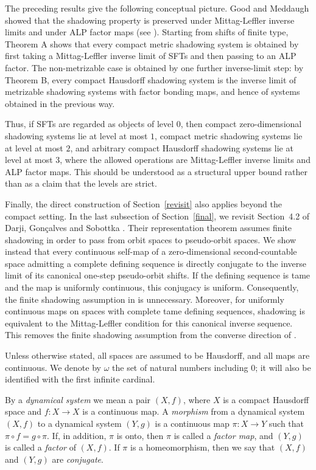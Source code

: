 \documentclass[10pt,a4paper]{amsart}
\numberwithin{equation}{section}
\begin{document}
The preceding results give the following conceptual picture. Good and
Meddaugh showed that the shadowing property is preserved under
Mittag-Leffler inverse limits and under ALP factor
maps (see \cite[Section 5]{GM}). Starting from shifts of finite type, Theorem A shows that
every compact metric shadowing system is obtained by first taking a
Mittag-Leffler inverse limit of SFTs and then passing to an ALP factor. The
non-metrizable case is obtained by one further inverse-limit step: by Theorem
B, every compact Hausdorff shadowing system is the inverse limit of
metrizable shadowing systems with factor bonding maps, and hence of systems
obtained in the previous way.

Thus, if SFTs are regarded as objects of level $0$, then compact
zero-dimensional shadowing systems lie at level at most $1$, compact metric
shadowing systems lie at level at most $2$, and arbitrary compact Hausdorff
shadowing systems lie at level at most $3$, where the allowed operations are
Mittag-Leffler inverse limits and ALP factor maps. This should be understood as
a structural upper bound rather than as a claim that the levels are strict.

Finally, the direct construction of Section~\ref{revisit} also applies beyond
the compact setting. In the last subsection of Section~\ref{final}, we
revisit Section~4.2 of Darji, Gon\c{c}alves and Sobottka \cite{Darji}.
Their representation theorem assumes finite shadowing in order to pass from
orbit spaces to pseudo-orbit spaces. We show instead that every continuous
self-map of a zero-dimensional second-countable space admitting a complete
defining sequence is directly conjugate to the inverse limit of its canonical
one-step pseudo-orbit shifts. If the defining sequence is tame and the map is
uniformly continuous, this conjugacy is uniform. Consequently, the finite
shadowing assumption in \cite[Theorem~4.2.8]{Darji} is unnecessary.
Moreover, for uniformly continuous maps on spaces with complete tame defining
sequences, shadowing is equivalent to the Mittag-Leffler condition for this
canonical inverse sequence. This removes the finite shadowing assumption from
the converse direction of \cite[Theorem~4.2.9(ii)]{Darji}.


Unless otherwise stated, all spaces are assumed to be Hausdorff, and all maps are
continuous.
We denote by $\omega$ the set of natural numbers including $0$; it will also be
identified with the first infinite cardinal. 

By a \emph{dynamical system} we
mean a pair $(X,f)$, where $X$ is a compact Hausdorff space and
$f:X\to X$ is a continuous map.
A \emph{morphism} from a dynamical system $(X,f)$ to a dynamical system
$(Y,g)$ is a continuous map $\pi:X\to Y$ such that $\pi\circ f=g\circ \pi$.
If, in addition, $\pi$ is onto, then $\pi$ is called a \emph{factor map}, and
$(Y,g)$ is called a \emph{factor} of $(X,f)$. If $\pi$ is a homeomorphism, then
we say that $(X,f)$ and $(Y,g)$ are \emph{conjugate}.
\end{document}

